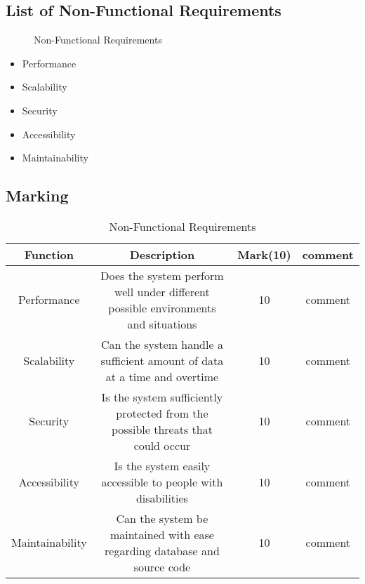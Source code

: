 \documentclass[12pt]{article}
\begin{document}
\subsection{List of Non-Functional Requirements}

	\begin{description}
		\item[] Non-Functional Requirements
	\end{description}
	\begin{itemize}
	
		\item Performance 
		\item Scalability 
		\item Security 
		\item Accessibility
		\item Maintainability
		
	\end{itemize}

	\subsection{Marking}
	
			\begin{table}[h!]	
			\settowidth{\longline}{This function returns a}
			\centering
			\caption{Non-Functional Requirements}
			\label{tab:table2}
			\begin{tabular}{|c|c|c|c|}
				
				\hline
				\hline
				Function  & Description & Mark(10)  & comment\\
				\hline
				\hline
				
				Performance  & \parbox[t]{\longline}{Does the system perform well under different possible environments and situations} & 10 & \parbox[t]{\longline}{comment}\\
				
				\hline
				Scalability & \parbox[t]{\longline}{Can the system handle a sufficient amount of data at a time and overtime} &  10 & \parbox[t]{\longline}{comment}\\
				\hline
				Security & \parbox[t]{\longline}{Is the system sufficiently protected from the possible threats that could occur} & 10 & \parbox[t]{\longline}{comment}\\
				\hline
				Accessibility & \parbox[t]{\longline}{Is the system easily accessible to people with disabilities} & 10 & \parbox[t]{\longline}{comment}\\
				\hline
				Maintainability & \parbox[t]{\longline}{Can the system be maintained with ease regarding database and source code} &  10 & \parbox[t]{\longline}{comment}\\
				\hline
			\end{tabular}
			
		\end{table}
\end{document}
